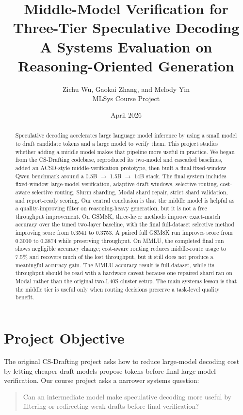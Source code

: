 \documentclass[11pt]{article}
\title{Middle-Model Verification for Three-Tier Speculative Decoding\\A Systems Evaluation on Reasoning-Oriented Generation}
\author{Zichu Wu, Gaokai Zhang, and Melody Yin\\MLSys Course Project}
\date{April 2026}
\begin{document}
\maketitle

\begin{abstract}
Speculative decoding accelerates large language model inference by using a small model to draft candidate tokens and a large model to verify them. This project studies whether adding a middle model makes that pipeline more useful in practice. We began from the CS-Drafting codebase, reproduced its two-model and cascaded baselines, added an ACSD-style middle-verification prototype, then built a final fixed-window Qwen benchmark around a 0.5B $\rightarrow$ 1.5B $\rightarrow$ 14B stack. The final system includes fixed-window large-model verification, adaptive draft windows, selective routing, cost-aware selective routing, Slurm sharding, Modal shard repair, strict shard validation, and report-ready scoring. Our central conclusion is that the middle model is helpful as a quality-improving filter on reasoning-heavy generation, but it is not a free throughput improvement. On GSM8K, three-layer methods improve exact-match accuracy over the tuned two-layer baseline, with the final full-dataset selective method improving score from 0.3541 to 0.3753. A paired full GSM8K run improves score from 0.3010 to 0.3874 while preserving throughput. On MMLU, the completed final run shows negligible accuracy change; cost-aware routing reduces middle-route usage to 7.5\% and recovers much of the lost throughput, but it still does not produce a meaningful accuracy gain. The MMLU accuracy result is full-dataset, while its throughput should be read with a hardware caveat because one repaired shard ran on Modal rather than the original two-L40S cluster setup. The main systems lesson is that the middle tier is useful only when routing decisions preserve a task-level quality benefit.
\end{abstract}

\section{Project Objective}

The original CS-Drafting project asks how to reduce large-model decoding cost by letting cheaper draft models propose tokens before final large-model verification. Our course project asks a narrower systems question:

\begin{quote}
Can an intermediate model make speculative decoding more useful by filtering or redirecting weak drafts before final verification?
\end{quote}
\end{document}

